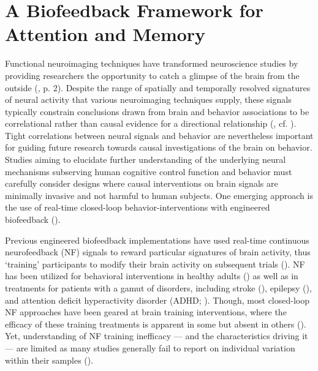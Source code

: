 \chapter{A Biofeedback Framework for Attention and Memory}

Functional neuroimaging techniques have transformed neuroscience studies by providing researchers the opportunity to catch a glimpse of the brain from the outside (\cite{poldrack2018new}, p. 2). Despite the range of spatially and temporally resolved signatures of neural activity that various neuroimaging techniques supply, these signals typically constrain conclusions drawn from brain and behavior associations to be correlational rather than causal evidence for a directional relationship (\cite{atkinson2005visual}, cf. \cite{weber2010functional}). Tight correlations between neural signals and behavior are nevertheless important for guiding future research towards causal investigations of the brain on behavior. Studies aiming to elucidate further understanding of the underlying neural mechanisms subserving human cognitive control function and behavior must carefully consider designs where causal interventions on brain signals are minimally invasive and not harmful to human subjects. One emerging approach is the use of real-time closed-loop behavior-interventions with engineered biofeedback (\cite{laconte2011decoding, alkoby2018can}).

Previous engineered biofeedback implementations have used real-time continuous neurofeedback (NF) signals to reward particular signatures of brain activity, thus `training' participants to modify their brain activity on subsequent trials (\cite{alkoby2018can}). NF has been utilized for behavioral interventions in healthy adults (\cite{hoedlmoser2008instrumental, zoefel2011neurofeedback, wang2013neurofeedback, gruzelier2014eegA, gruzelier2014eegB}) as well as in treatments for patients with a gamut of disorders, including stroke (\cite{rayegani2014effect, doppelmayr2007attempt}), epilepsy (\cite{kotchoubey2001modification, walker2005neurofeedback, sterman2006foundation, tan2009meta, strehl2014sustained}), and attention deficit hyperactivity disorder (ADHD; \cite{thompson2005neurofeedback, leins2007neurofeedback, arns2009efficacy, sonuga2013nonpharmacological}). Though, most closed-loop NF approaches have been geared at brain training interventions, where the efficacy of these training treatments is apparent in some but absent in others (\cite{alkoby2018can, weber2011predicting}). Yet, understanding of NF training inefficacy --- and the characteristics driving it --- are limited as many studies generally fail to report on individual variation within their samples (\cite{alkoby2018can}).

